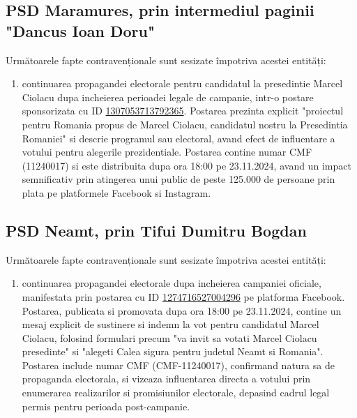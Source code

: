 \documentclass[a4paper,12pt]{article}
\begin{document}
\vspace{0.5cm}

\subsection{PSD Maramures, prin intermediul paginii "Dancus Ioan Doru"}
Următoarele fapte contravenționale sunt sesizate împotriva acestei entități:

\begin{enumerate}[leftmargin=*, label=\arabic*.)]
    \item continuarea propagandei electorale pentru candidatul la presedintie Marcel Ciolacu dupa incheierea perioadei legale de campanie, intr-o postare sponsorizata cu ID \href{https://www.facebook.com/ads/library/?id=1307053713792365}{1307053713792365}. Postarea prezinta explicit "proiectul pentru Romania propus de Marcel Ciolacu, candidatul nostru la Presedintia Romaniei" si descrie programul sau electoral, avand efect de influentare a votului pentru alegerile prezidentiale. Postarea contine numar CMF (11240017) si este distribuita dupa ora 18:00 pe 23.11.2024, avand un impact semnificativ prin atingerea unui public de peste 125.000 de persoane prin plata pe platformele Facebook si Instagram.
\end{enumerate}

\vspace{0.5cm}

\subsection{PSD Neamt, prin Tifui Dumitru Bogdan}
Următoarele fapte contravenționale sunt sesizate împotriva acestei entități:

\begin{enumerate}[leftmargin=*, label=\arabic*.)]
    \item continuarea propagandei electorale dupa incheierea campaniei oficiale, manifestata prin postarea cu ID \href{https://www.facebook.com/ads/library/?id=1274716527004296}{1274716527004296} pe platforma Facebook. Postarea, publicata si promovata dupa ora 18:00 pe 23.11.2024, contine un mesaj explicit de sustinere si indemn la vot pentru candidatul Marcel Ciolacu, folosind formulari precum "va invit sa votati Marcel Ciolacu presedinte" si "alegeti Calea sigura pentru judetul Neamt si Romania". Postarea include numar CMF (CMF-11240017), confirmand natura sa de propaganda electorala, si vizeaza influentarea directa a votului prin enumerarea realizarilor si promisiunilor electorale, depasind cadrul legal permis pentru perioada post-campanie.
\end{enumerate}
\end{document}
